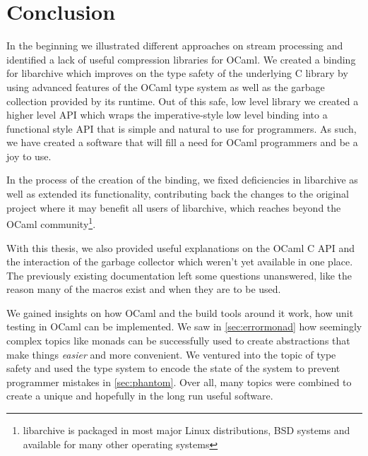 \documentclass[parskip=half]{scrreprt}
\begin{document}
\section{Conclusion}
\label{sec:conclusion}


In the beginning we illustrated different approaches on stream processing and
identified a lack of useful compression libraries for OCaml. We created a
binding for libarchive which improves on the type safety of the underlying C
library by using advanced features of the OCaml type system as well as the
garbage collection provided by its runtime. Out of this safe, low level library
we created a higher level API which wraps the imperative-style low level
binding into a functional style API that is simple and natural to use for
programmers. As such, we have created a software that will fill a need for
OCaml programmers and be a joy to use.

In the process of the creation of the binding, we fixed deficiencies in
libarchive as well as extended its functionality, contributing back the changes
to the original project where it may benefit all users of libarchive, which
reaches beyond the OCaml community\footnote{libarchive is packaged in most
major Linux distributions, BSD systems and available for many other
operating systems}.

With this thesis, we also provided useful explanations on the OCaml C API and
the interaction of the garbage collector which weren't yet available in one
place. The previously existing documentation left some questions unanswered,
like the reason many of the macros exist and when they are to be used.

We gained insights on how OCaml and the build tools around it work, how unit
testing in OCaml can be implemented. We saw in \autoref{sec:errormonad} how
seemingly complex topics like monads can be successfully used to create
abstractions that make things \emph{easier} and more convenient. We ventured
into the topic of type safety and used the type system to encode the state of
the system to prevent programmer mistakes in \autoref{sec:phantom}. Over all,
many topics were combined to create a unique and hopefully in the long run
useful software.

\printbibliography
\end{document}
